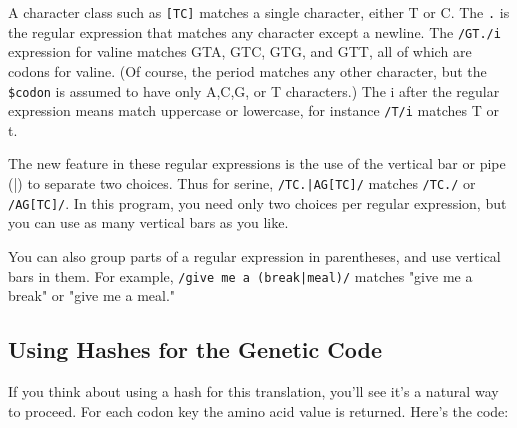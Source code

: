 A character class such as \verb|[TC]| matches a single character, either T or C. The \verb|.| is the regular expression that matches any character except a newline. The \verb|/GT./i| expression for valine matches GTA, GTC, GTG, and GTT, all of which are codons for valine. (Of course, the period matches any other character, but the \verb|$codon| is assumed to have only A,C,G, or T characters.) The i after the regular expression means match uppercase or lowercase, for instance \verb|/T/i| matches T or t.

The new feature in these regular expressions is the use of the vertical bar or pipe (|) to separate two choices. Thus for serine, \verb=/TC.|AG[TC]/= matches \verb|/TC./| or \verb|/AG[TC]/|. In this program, you need only two choices per regular expression, but you can use as many vertical bars as you like.

You can also group parts of a regular expression in parentheses, and use vertical bars in them. For example, \verb=/give me a (break|meal)/= matches "give me a break" or "give me a meal." 

\subsection{Using Hashes for the Genetic Code}
If you think about using a hash for this translation, you'll see it's a natural way to proceed. For each codon key the amino acid value is returned. Here's the code: 

